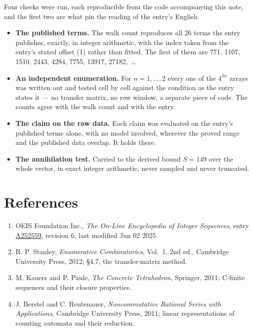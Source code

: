 \documentclass[11pt]{article}
\theoremstyle{definition}
\begin{document}
Four checks were run, each reproducible from the code accompanying this note, and the first two are what pin the reading of the entry's English.

\begin{itemize}

\item {\bfseries The published terms.} The walk count reproduces all 26 terms the entry publishes, exactly, in integer arithmetic, with the index taken from the entry's stated offset (1) rather than fitted. The first of them are 771, 1107, 1510, 2443, 4284, 7755, 13917, 27182,~\dots

\item {\bfseries An independent enumeration.} For $n = 1,\dots,2$ every one of the $4^{3n}$ arrays was written out and tested cell by cell against the condition as the entry states it --- no transfer matrix, no row window, a separate piece of code. The counts agree with the walk count and with the entry.

\item {\bfseries The claim on the raw data.} Each claim was evaluated on the entry's published terms alone, with no model involved, wherever the proved range and the published data overlap. It holds there.

\item {\bfseries The annihilation test.} Carried to the derived bound $S = 149$ over the whole vector, in exact integer arithmetic, never sampled and never truncated.

\end{itemize}

\section{References}

\begin{enumerate}

\item OEIS Foundation Inc., \emph{The On-Line Encyclopedia of Integer Sequences}, entry \href{https://oeis.org/A252559}{A252559}, revision 6, last modified Jun 02 2025.

\item R. P. Stanley, \emph{Enumerative Combinatorics}, Vol.~1, 2nd ed., Cambridge University Press, 2012; \S4.7, the transfer-matrix method.

\item M. Kauers and P. Paule, \emph{The Concrete Tetrahedron}, Springer, 2011; C-finite sequences and their closure properties.

\item J. Berstel and C. Reutenauer, \emph{Noncommutative Rational Series with Applications}, Cambridge University Press, 2011; linear representations of counting automata and their reduction.

\end{enumerate}
\end{document}
